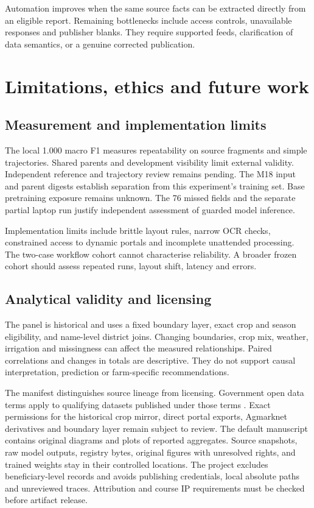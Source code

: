 \documentclass[11pt,a4paper]{article}
\begin{document}
Automation improves when the same source facts can be extracted directly from an eligible report. Remaining bottlenecks include access controls, unavailable responses and publisher blanks. They require supported feeds, clarification of data semantics, or a genuine corrected publication.

\clearpage
\section{Limitations, ethics and future work}
\subsection{Measurement and implementation limits}
The local 1.000 macro F1 measures repeatability on source fragments and simple trajectories. Shared parents and development visibility limit external validity. Independent reference and trajectory review remains pending. The M18 input and parent digests establish separation from this experiment's training set. Base pretraining exposure remains unknown. The 76 missed fields and the separate partial laptop run justify independent assessment of guarded model inference.

Implementation limits include brittle layout rules, narrow OCR checks, constrained access to dynamic portals and incomplete unattended processing. The two-case workflow cohort cannot characterise reliability. A broader frozen cohort should assess repeated runs, layout shift, latency and errors.

\subsection{Analytical validity and licensing}
The panel is historical and uses a fixed boundary layer, exact crop and season eligibility, and name-level district joins. Changing boundaries, crop mix, weather, irrigation and missingness can affect the measured relationships. Paired correlations and changes in totals are descriptive. They do not support causal interpretation, prediction or farm-specific recommendations.

The manifest distinguishes source lineage from licensing. Government open data terms apply to qualifying datasets published under those terms \cite{godl}. Exact permissions for the historical crop mirror, direct portal exports, Agmarknet derivatives and boundary layer remain subject to review. The default manuscript contains original diagrams and plots of reported aggregates. Source snapshots, raw model outputs, registry bytes, original figures with unresolved rights, and trained weights stay in their controlled locations. The project excludes beneficiary-level records and avoids publishing credentials, local absolute paths and unreviewed traces. Attribution and course IP requirements must be checked before artifact release.
\end{document}
